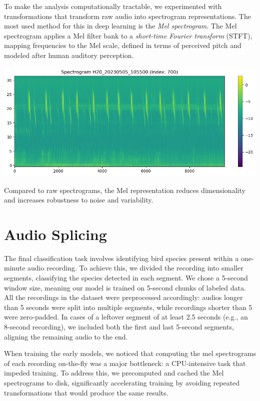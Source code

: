 \documentclass[10pt]{article}
\begin{document}
To make the analysis computationally tractable, we experimented with transformations that transform raw audio into spectrogram representations. The most used method for this in deep learning is the \emph{Mel spectrogram}. The Mel spectrogram applies a Mel filter bank to a \emph{short-time Fourier transform} (STFT), mapping frequencies to the Mel scale, defined in terms of perceived pitch and modeled after human auditory perception.

\begin{center}
  \includegraphics[width=0.7\linewidth]{img/scape_spectrogram.png}
\end{center}

Compared to raw spectrograms, the Mel representation reduces dimensionality and increases robustness to noise and variability. 

\section*{Audio Splicing}

The final classification task involves identifying bird species present within a one-minute audio recording. To achieve this, we divided the recording into smaller segments, classifying the species detected in each segment. We chose a 5-second window size, meaning our model is trained on 5-second chunks of labeled data. All the recordings in the dataset were preprocessed accordingly: audios longer than 5 seconds were split into multiple segments, while recordings shorter than 5 were zero-padded. In cases of a leftover segment of at least 2.5 seconds (e.g., an 8-second recording), we included both the first and last 5-second segments, aligning the remaining audio to the end.

When training the early models, we noticed that computing the mel spectrograms of each recording on-the-fly was a major bottleneck: a CPU-intensive task that impeded training. To address this, we precomputed and cached the Mel spectrograms to disk, significantly accelerating training by avoiding repeated transformations that would produce the same results.
\end{document}
